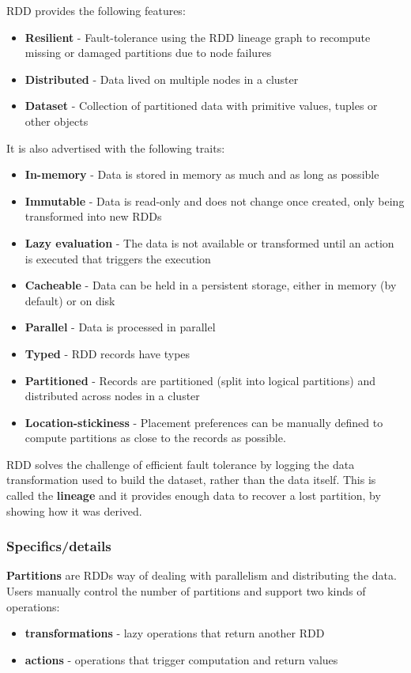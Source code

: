 \documentclass{sty/SizheArticle}
\begin{document}
RDD provides the following features:
\begin{itemize}
\item \textbf{Resilient} - Fault-tolerance using the RDD lineage graph to
recompute missing or damaged partitions due to node failures
\item \textbf{Distributed} - Data lived on multiple nodes in a cluster
\item \textbf{Dataset} - Collection of partitioned data with primitive
values, tuples or other objects
\end{itemize}

It is also advertised with the following traits:
\begin{itemize}
\item \textbf{In-memory} - Data is stored in memory as much and as long
as possible
\item \textbf{Immutable} - Data is read-only and does not change once created,
only being transformed into new RDDs
\item \textbf{Lazy evaluation} - The data is not available or transformed until
an action is executed that triggers the execution
\item \textbf{Cacheable} - Data can be held in a persistent storage, either in
memory (by default) or on disk
\item \textbf{Parallel} - Data is processed in parallel
\item \textbf{Typed} - RDD records have types
\item \textbf{Partitioned} - Records are partitioned (split into logical
partitions) and distributed across nodes in a cluster
\item \textbf{Location-stickiness} - Placement preferences can be manually
defined to compute partitions as close to the records as possible.
\end{itemize}

RDD solves the challenge of efficient fault tolerance by logging the data
transformation used to build the dataset, rather than the data itself. This
is called the \textbf{lineage} and it provides enough data to recover
a lost partition, by showing how it was derived. 


\subsubsection{Specifics/details}
\textbf{Partitions} are RDDs way of dealing with parallelism and distributing
the data. Users manually control the number of partitions and support two
kinds of operations:
\begin{itemize}
\item \textbf{transformations} - lazy operations that return another RDD
\item \textbf{actions} - operations that trigger computation  and return values
\end{itemize}
\end{document}
